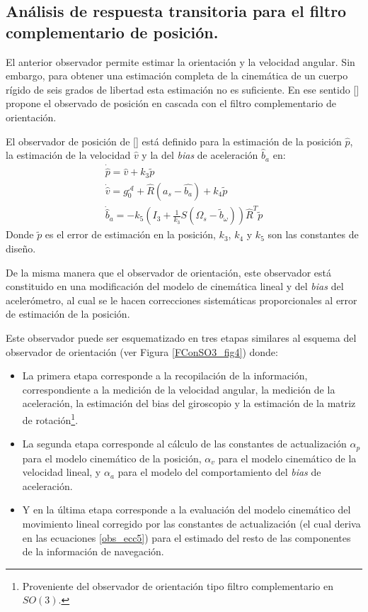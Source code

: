 \documentclass[10pt]{report}
\numberwithin{equation}{chapter}
\numberwithin{algorithm}{chapter}
\newcommand{\bias}{\emph{bias} }
\begin{document}
\subsection{Análisis de respuesta transitoria para el filtro complementario de posición.}
El anterior observador permite estimar la orientación y la velocidad angular. Sin embargo, para obtener una estimación completa de la cinemática de un cuerpo rígido de seis grados de libertad esta estimación no es suficiente. En ese sentido [\cite{Scandaro2011}] propone el observado de posición en cascada con el filtro complementario de orientación. \par
El observador de posición de [\cite{Scandaro2011}] está definido para la estimación de la posición $\hat{p}$, la estimación de la velocidad $\hat{v}$ y la del \emph{bias} de aceleración $\hat{b}_{a}$ en:
\begin{equation}\label{obs_ecc5}
\begin{array}{c}
\dot{\hat{p}}=\hat{v}+k_3\tilde{p}\\
\dot{\hat{v}}=g^\mathcal{A}_0+\hat{R}(a_s-\hat{b_a})+k_4\tilde{p}\\
\dot{\hat{b}}_a=-k_5(I_3+\frac{1}{k_3}S(\Omega_s-\tilde{b}_\omega))\hat{R}^T\tilde{p}
\end{array}
\end{equation}
Donde $\tilde{p}$ es el error de estimación en la posición, $k_3$, $k_4$ y $k_5$ son las constantes de diseño.\par
De la misma manera que el observador de orientación, este observador está constituido en una modificación del modelo de cinemática lineal y del \bias del acelerómetro, al cual se le hacen correcciones sistemáticas proporcionales al error de estimación de la posición. \par
Este observador puede ser esquematizado en tres etapas similares al esquema del observador de orientación (ver Figura \ref{FConSO3_fig4}) donde:
\begin{itemize}
\item La primera etapa corresponde a la recopilación de la información, correspondiente a la medición de la velocidad angular, la medición de la aceleración, la estimación del bias del giroscopio y la estimación de la matriz de rotación\footnote{Proveniente del observador de orientación tipo filtro complementario en $SO(3)$.}.
\item La segunda etapa corresponde al cálculo de las constantes de actualización $\alpha_p$ para el modelo cinemático de la posición, $\alpha_v$ para el modelo cinemático de la velocidad lineal, y $\alpha_a$ para el modelo del comportamiento del \bias de aceleración.
\item Y en la última etapa corresponde a la evaluación del modelo cinemático del movimiento lineal corregido por las constantes de actualización (el cual deriva en las ecuaciones \eqref{obs_ecc5}) para el estimado del resto de las componentes de la información de navegación.
\end{itemize}
\end{document}
